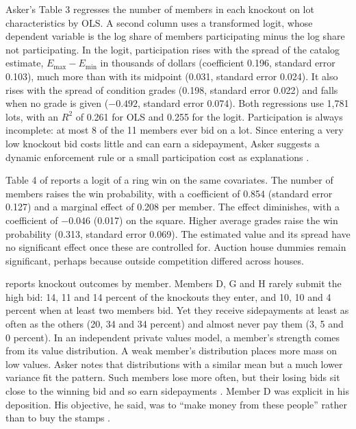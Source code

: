 Asker's Table 3 regresses the number of members in each knockout on lot characteristics by OLS. A second
column uses a transformed logit, whose dependent variable is the log share of members participating minus the
log share not participating. In the logit, participation rises with the spread of the catalog estimate,
$E_{\max}-E_{\min}$ in thousands of dollars (coefficient 0.196, standard error 0.103), much more than with its
midpoint (0.031, standard error 0.024). It also rises with the spread of condition grades (0.198, standard error
0.022) and falls when no grade is given ($-0.492$, standard error 0.074). Both regressions use 1,781 lots, with
an $R^2$ of 0.261 for OLS and 0.255 for the logit. Participation is always incomplete: at most 8 of the 11
members ever bid on a lot. Since entering a very low knockout bid costs little and can earn a sidepayment, Asker suggests a dynamic
enforcement rule or a small participation cost as explanations \citep[pp.~737--738]{Asker2010}.

Table 4 of \citet{Asker2010} reports a logit of a ring win on the same covariates. The number of members raises
the win probability, with a coefficient of 0.854 (standard error 0.127) and a marginal effect of 0.208 per
member. The effect diminishes, with a coefficient of $-0.046$ (0.017) on the square. Higher average grades raise
the win probability (0.313, standard error 0.069). The estimated value and its spread have no significant effect
once these are controlled for. Auction house dummies remain significant, perhaps because outside competition
differed across houses.

 reports knockout outcomes by member. Members D, G and H rarely submit the high bid: 14, 11
and 14 percent of the knockouts they enter, and 10, 10 and 4 percent when at least two members bid. Yet they
receive sidepayments at least as often as the others (20, 34 and 34 percent) and almost never pay them (3, 5
and 0 percent). In an independent private values model, a member's strength comes from its value distribution.
A weak member's distribution places more mass on low values. Asker notes that distributions with a similar mean
but a much lower variance fit the pattern. Such members lose more often, but their losing bids sit close to the
winning bid and so earn sidepayments \citep[footnote 30]{Asker2010}. Member D was explicit in his deposition.
His objective, he said, was to ``make money from these people'' rather than to buy the stamps
\citep[p.~738]{Asker2010}.

